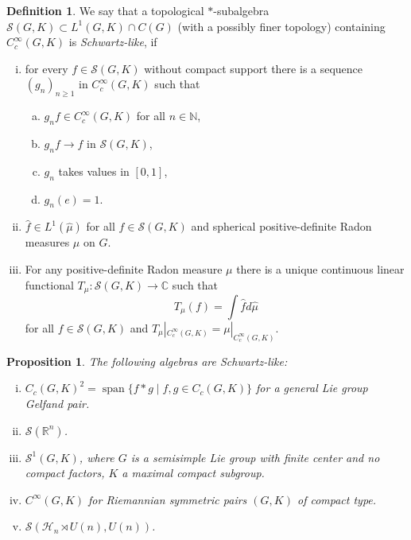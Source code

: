 \documentclass[12pt,reqno,a4paper]{amsart}
\theoremstyle{theorem}
\newtheorem{proposition}[theorem]{Proposition}
\theoremstyle{definition}
\newtheorem{definition}[theorem]{Definition}
\numberwithin{theorem}{section}
\numberwithin{equation}{section}
\newcommand{\R}{\mathbb{R}}
\newcommand{\N}{\mathbb{N}}
\newcommand{\C}{\mathbb{C}}
\DeclareMathOperator{\lspan}{span}
\begin{document}
\begin{definition}\label{d:Schwartz-like}
	We say that a topological $*$-subalgebra $\mathcal{S}(G,K)\subset L^1(G,K)\cap C(G)$ (with a possibly finer topology) containing $C_c^\infty(G,K)$ is \emph{Schwartz-like}, if 
	\begin{enumerate}[(i)]
		\item for every $f\in \mathcal{S}(G, K)$ without compact support there is a sequence $(g_n)_{n\geq 1}$ in $C_c^\infty(G,K)$ such that \begin{enumerate}[a)]
			\item $g_nf\in C_c^\infty(G,K)$ for all $n\in \N$,
			\item $g_nf\to f$ in $\mathcal{S}(G,K)$,
			\item $g_n$ takes values in $[0,1]$,
			\item $g_n(e)=1$.
		\end{enumerate}
		\item $\widehat{f}\in L^1(\widehat{\mu})$ for all $f\in \mathcal{S}(G,K)$ and spherical positive-definite Radon measures $\mu$ on $G$.
		\item For any positive-definite Radon measure $\mu$ there is a unique continuous linear functional $T_\mu:\mathcal{S}(G,K)\to \C$ such that
		\[T_\mu(f) = \int \widehat{f}d\widehat{\mu}\]
		for all $f\in \mathcal{S}(G,K)$ and $T_\mu|_{C_c^\infty(G,K)} = \mu|_{C_c^\infty(G,K)}$.
	\end{enumerate} 
\end{definition}
\begin{proposition}\label{e:examples_Schwartz_like}
	The following algebras are Schwartz-like:
	\begin{enumerate}[(i)]
		\item $C_c(G,K)^2=\lspan\{f*g\mid f,g\in C_c(G,K)\}$ for a general Lie group Gelfand pair.
		\item $\mathscr{S}(\R^n)$.
		\item $\mathscr{S}^1(G,K)$, where $G$ is a semisimple Lie group with finite center and no compact factors, $K$ a maximal compact subgroup.
		\item $C^\infty(G,K)$ for Riemannian symmetric pairs $(G,K)$ of compact type.
		\item $\mathscr{S}(\mathcal{H}_n\rtimes U(n), U(n))$.
	\end{enumerate}
\end{proposition}
\end{document}
